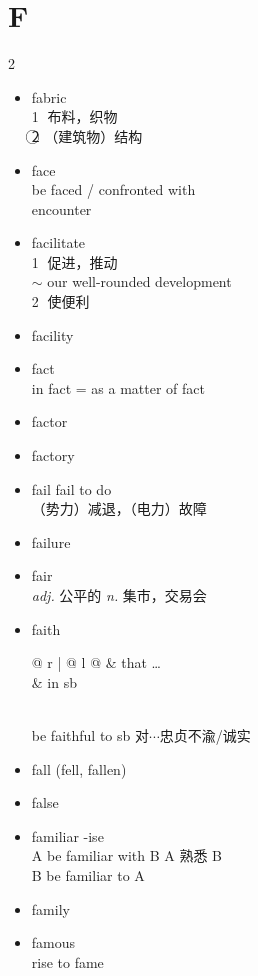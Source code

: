 \documentclass[../../book.tex]{subfiles}
\begin{document}
\section{F}
\raggedcolumns
\begin{multicols}{2}
\begin{itemize}
\item[-] fabric
\\\textcircled{1} 布料，织物
\\\textcircled{2} （建筑物）结构
\item[-] face
\\be faced / confronted with
\\encounter
\item[-] facilitate
\\\textcircled{1} 促进，推动 
\\$\sim$ our well-rounded development
\\\textcircled{2} 使便利
\item[-] facility
\item[-] fact
\\in fact = as a matter of fact
\item[-] factor
\item[-] factory
\item[-] fail \phantom{a} fail to do
\\（势力）减退，（电力）故障
\item[-] failure
\item[-] fair
\\\emph{adj.} 公平的 \emph{n.} 集市，交易会
\item[-] faith
\\\begin{tabular}{@{} r | @{\hspace{0.1em}} l @{}}
 & that \ldots
\\& in sb
\end{tabular}
\\be faithful to sb {\small 对$\cdots$忠贞不渝/诚实}
\item[-] fall (fell, fallen)
\item[-] false
\item[-] familiar \phantom{a} -ise
\\A be familiar with B A 熟悉 B
\\B be familiar to A
\item[-] family
\item[-] famous
\\rise to fame
\\\begin{tabular}{@{} r | @{\hspace{0.1em}} l @{}}

\end{tabular}
\end{itemize}
\end{multicols}
\end{document}
